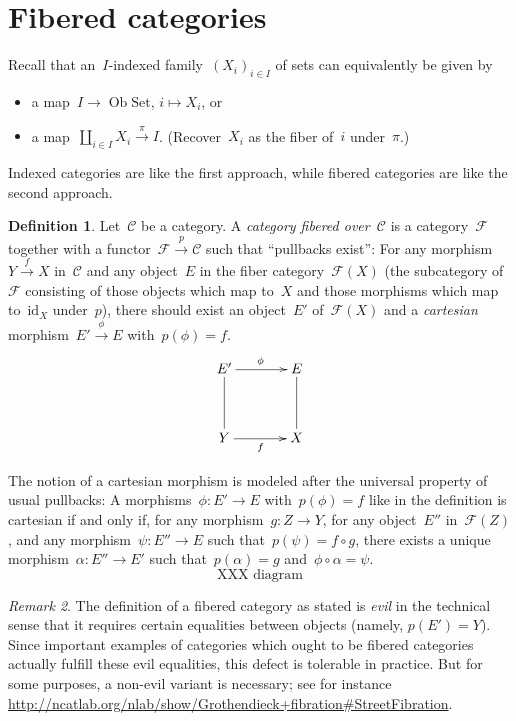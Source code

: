 \documentclass[a4paper,english,12pt]{scrartcl}
\theoremstyle{definition}
\newtheorem{defn}{Definition}[section]
\theoremstyle{plain}
\theoremstyle{remark}
\newtheorem{rem}[defn]{Remark}
\newcommand{\C}{\mathcal{C}}
\newcommand{\F}{\mathcal{F}}
\newcommand{\id}{\mathrm{id}}
\newcommand{\xra}[1]{\xrightarrow{#1}}
\newcommand{\Set}{\mathrm{Set}}
\newcommand{\Ob}{\operatorname{Ob}}
\begin{document}
\section{Fibered categories}

Recall that an~$I$-indexed family~$(X_i)_{i \in I}$ of sets can equivalently be
given by
\begin{itemize}
\item a map~$I \to \Ob\Set$, $i \mapsto X_i$, or
\item a map~$\coprod_{i \in I} X_i \xra{\pi} I$. (Recover~$X_i$ as the fiber
of~$i$ under~$\pi$.)
\end{itemize}
Indexed categories are like the first approach, while fibered categories are
like the second approach.

\begin{defn}Let~$\C$ be a category. A \emph{category fibered over~$\C$} is a
category~$\F$ together with a functor~$\F \xra{p} \C$ such that ``pullbacks
exist'': For any morphism~$Y \xra{f} X$ in~$\C$ and any object~$E$ in the fiber
category~$\F(X)$ (the subcategory of~$\F$ consisting of those objects which map
to~$X$ and those morphisms which map to~$\id_X$ under~$p$), there should
exist an object~$E'$ of~$\F(X)$ and a \emph{cartesian} morphism~$E' \xra{\phi}
E$ with~$p(\phi) = f$.
\[ \xymatrixcolsep{3pc}\xymatrixrowsep{3pc}\xymatrix{
  E' \ar@{-}[d] \ar^\phi[r] & E \ar@{-}[d] \\
  Y \ar[r]_f & X
} \]
\end{defn}

The notion of a cartesian morphism is modeled after the universal property of
usual pullbacks: A morphisms~$\phi : E' \to E$ with~$p(\phi) = f$ like in the
definition is cartesian if and only if, for any morphism~$g : Z \to Y$, for any
object~$E''$ in~$\F(Z)$, and any morphism~$\psi : E'' \to E$ such that~$p(\psi)
= f \circ g$, there exists a unique morphism~$\alpha : E'' \to E'$ such
that~$p(\alpha) = g$ and~$\phi \circ \alpha = \psi$.
\[ \text{XXX diagram} \]

\begin{rem}The definition of a fibered category as stated is \emph{evil} in the
technical sense that it requires certain equalities between objects (namely,
$p(E') = Y$). Since important examples of categories which ought to be fibered
categories actually fulfill these evil equalities, this defect is tolerable in
practice. But for some purposes, a non-evil variant is necessary; see for
instance
\url{http://ncatlab.org/nlab/show/Grothendieck+fibration#StreetFibration}.\end{rem}
\end{document}
